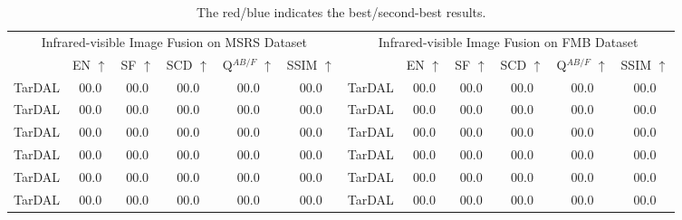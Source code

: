\documentclass[letterpaper]{article} %
\begin{document}
\begin{table*}[ht!]
{\begin{tabular}{ccccc ccccc cc}
\toprule
            \multicolumn{6}{c}{Infrared-visible Image Fusion on MSRS Dataset}
            &\multicolumn{6}{c}{Infrared-visible Image Fusion on FMB Dataset}\\
                &EN $\uparrow$ &SF $\uparrow$ &SCD $\uparrow$  &Q$^{AB/F}$ $\uparrow$  &SSIM $\uparrow$  &  &EN $\uparrow$ &SF $\uparrow$ &SCD $\uparrow$  &Q$^{AB/F}$ $\uparrow$  &SSIM $\uparrow$  \\
\midrule[0.5pt]  
TarDAL&\cellcolor{color_blue}00.0 &\cellcolor{blue!8}00.0 &00.0 &00.0 &00.0 &TarDAL &00.0 &\cellcolor{blue!8}00.0 &00.0 &\cellcolor{color_blue}00.0 &\cellcolor{color_blue}00.0 \\
TarDAL&\cellcolor{color_blue}00.0 &\cellcolor{blue!8}00.0 &00.0 &00.0 &00.0 &TarDAL &00.0 &\cellcolor{blue!8}00.0 &00.0 &\cellcolor{color_blue}00.0 &\cellcolor{color_blue}00.0 \\
TarDAL&\cellcolor{color_blue}00.0 &\cellcolor{blue!8}00.0 &00.0 &00.0 &00.0 &TarDAL &00.0 &\cellcolor{blue!8}00.0 &00.0 &\cellcolor{color_blue}00.0 &\cellcolor{color_blue}00.0 \\
TarDAL&\cellcolor{color_blue}00.0 &\cellcolor{blue!8}00.0 &00.0 &00.0 &00.0 &TarDAL &00.0 &\cellcolor{blue!8}00.0 &00.0 &\cellcolor{color_blue}00.0 &\cellcolor{color_blue}00.0 \\
TarDAL&\cellcolor{color_blue}00.0 &\cellcolor{blue!8}00.0 &00.0 &00.0 &00.0 &TarDAL &00.0 &\cellcolor{blue!8}00.0 &00.0 &\cellcolor{color_blue}00.0 &\cellcolor{color_blue}00.0 \\
TarDAL&\cellcolor{color_blue}00.0 &\cellcolor{blue!8}00.0 &00.0 &00.0 &00.0 &TarDAL &00.0 &\cellcolor{blue!8}00.0 &00.0 &\cellcolor{color_blue}00.0 &\cellcolor{color_blue}00.0 \\
             \bottomrule
       \end{tabular}
   }
   \caption{The red/blue indicates the best/second-best results.}
\end{table*}
\end{document}
